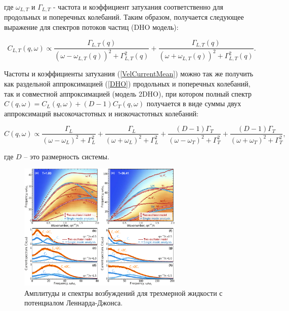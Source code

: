 \noindent
где $\omega_{L, T}$ и $\Gamma_{L, T}$ - частота и коэффициент затухания соответственно для продольных и поперечных колебаний. Таким образом, получается следующее выражение для спектров потоков частиц (DHO модель):

\begin{equation}
C_{L, T}(q, \omega) \propto \frac{\Gamma_{L, T}(q)}{(\omega - \omega_{L, T}(q))^2 + \Gamma^2_{L, T}(q)} + \frac{\Gamma_{L, T}(q)}{(\omega + \omega_{L, T}(q))^2 + \Gamma^2_{L, T}(q)}.
\label{DHO}
\end{equation}

Частоты и коэффициенты затухания (\ref{VelCurrentMean}) можно так же получить как раздельной аппроксимацией (\ref{DHO}) продольных и поперечных колебаний, так и совместной аппроксимацией (модель 2DHO), при котором полный спектр
$C(q, \omega) = C_L (q, \omega)+ (D -1) C_T(q, \omega)$ получается в виде суммы двух аппроксимаций высокочастотных и низкочастотных колебаний:

\begin{equation}
C(q, \omega) \propto \frac{\Gamma_{L}}{(\omega - \omega_{L})^2 + \Gamma^2_{L}} + \frac{\Gamma_{L}}{(\omega + \omega_{L})^2 + \Gamma^2_{L}} + \frac{(D - 1) \Gamma_{T}}{(\omega - \omega_{T})^2 + \Gamma^2_{T}} + \frac{(D - 1)\Gamma_{T}}{(\omega + \omega_{T})^2 + \Gamma^2_{T}},
\label{2DHO}
\end{equation}

\noindent
где $D$ -- это размерность системы.

\begin{figure}[htbp!]
\begin{center}
\includegraphics[width=0.7\textwidth]{Ris/CFS-Figure1.pdf}
\caption{Амплитуды и спектры возбуждений для трехмерной жидкости с потенциалом Леннарда-Джонса. }
\label{VelCurrent}
\end{center}
\end{figure}

